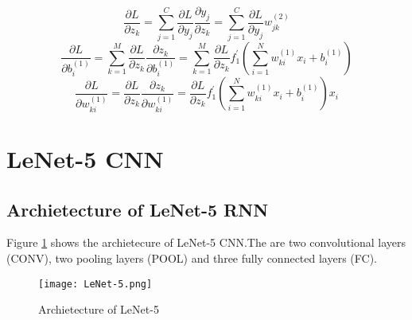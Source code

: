 \documentclass[11pt,a4paper]{article}
\begin{document}
\begin{displaymath}
\frac{\partial{}L}{\partial{}z_{k}} = \sum^{C}_{j=1}\frac{\partial{}L}{\partial{}y_{j}}\frac{\partial{}y_{j}}{\partial{}z_{k}}=\sum^{C}_{j=1}\frac{\partial{}L}{\partial{}y_{j}}w^{(2)}_{jk}
\end{displaymath}
\begin{displaymath}
\frac{\partial{}L}{\partial{}b^{(1)}_{i}} = \sum^{M}_{k=1}\frac{\partial{}L}{\partial{}z_{k}}\frac{\partial{}z_{k}}{\partial{}b^{(1)}_{i}}=\sum^{M}_{k=1}\frac{\partial{}L}{\partial{}z_{k}}f^{'}_{1}(\sum^{N}_{i=1}w^{(1)}_{ki}x_{i}+b^{(1)}_{i})
\end{displaymath}
\begin{displaymath}
\frac{\partial{}L}{\partial{}w^{(1)}_{ki}} = \frac{\partial{}L}{\partial{}z_{k}}\frac{\partial{}z_{k}}{\partial{}w^{(1)}_{ki}}=\frac{\partial{}L}{\partial{}z_{k}}f^{'}_{1}(\sum^{N}_{i=1}w^{(1)}_{ki}x_{i}+b^{(1)}_{i})x_{i}
\end{displaymath}
\section{LeNet-5 CNN}
\subsection{Archietecture of LeNet-5 RNN}
Figure \ref{LeNet-5} shows the archietecure of LeNet-5 CNN.The are two convolutional layers (CONV), two pooling layers (POOL) and three fully connected layers (FC).
\begin{figure}[htbp]
\centering
\texttt{[image: LeNet-5.png]}
\caption{Archietecture of LeNet-5}
\label{LeNet-5}
\end{figure}
\end{document}
